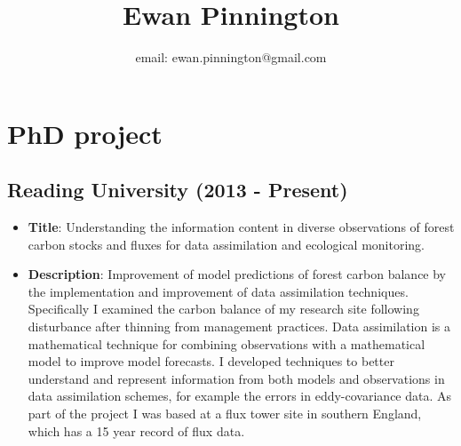 \documentclass[11pt]{article}
\title{\vspace{-2cm}Ewan Pinnington}
\author{email: ewan.pinnington@gmail.com}
\date{}
\begin{document}
\nobibliography*

\maketitle
 \vspace{-1.cm}
\section*{PhD project}
\subsection*{Reading University (2013 - Present) }
\begin{itemize}
\item \textbf{Title}: Understanding the information content in diverse observations of forest carbon stocks and fluxes for data assimilation and ecological monitoring.
\item \textbf{Description}: Improvement of model predictions of forest carbon balance by the implementation and improvement of data assimilation techniques. Specifically I examined the carbon balance of my research site following disturbance after thinning from management practices. Data assimilation is a mathematical technique for combining observations with a mathematical model to improve model forecasts. I developed techniques to better understand and represent information from both models and observations in data assimilation schemes, for example the errors in eddy-covariance data. As part of the project I was based at a flux tower site in southern England, which has a 15 year record of flux data.
\end{itemize}
\end{document}
